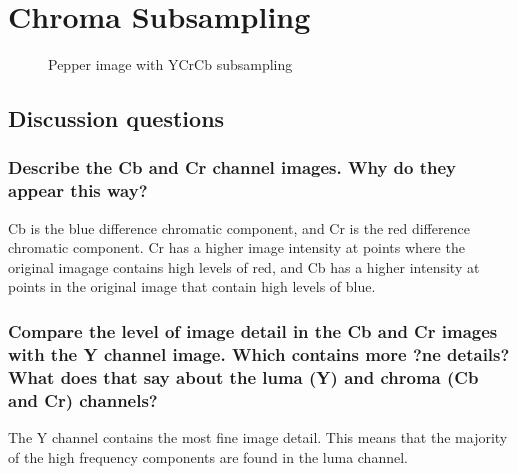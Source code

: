 \section{Chroma Subsampling}


\begin{figure}[ht]
\centering
\end{figure}

\begin{figure}[ht]
\centering
	\caption{Pepper image with YCrCb subsampling}
	\label{fig:noiseGeneration.toy}
\end{figure}
 

\subsection{Discussion questions}

\subsubsection{Describe the Cb and Cr channel images. Why do they appear this way?}
Cb is the blue difference chromatic component, and Cr is the red difference chromatic component. Cr has a higher image intensity at points where the original imagage contains high levels of red, and Cb has a higher intensity at points in the original image that contain high levels of blue.

\subsubsection{Compare the level of image detail in the Cb and Cr images with the Y channel image. Which contains
more ?ne details? What does that say about the luma (Y) and chroma (Cb and Cr) channels?}

The Y channel contains the most fine image detail. This means that the majority of the high frequency components are found in the luma channel.

